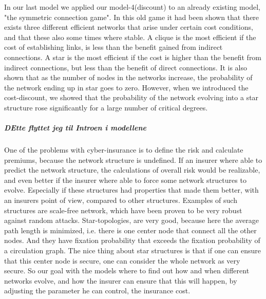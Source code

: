 In our last model we applied our model-4(discount) to an already existing model, "the symmetric connection game". In this old game it had been shown that there exists three different efficient networks that arise under certain cost conditions, and that these also some times where stable. A clique is the most efficient if the cost of establishing links, is less than the benefit gained from indirect connections. A star is the most efficient if the cost is higher than the benefit from indirect connections, but less than the benefit of direct connections. 
It is also shown that as the number of nodes in the networks increase, the probability of the network ending up in star goes to zero. However, when we introduced the cost-discount, we showed that the probability of the network evolving into a star structure rose significantly for a large number of critical degrees. 
\subparagraph{DEtte flyttet jeg til Introen i modellene}
One of the problems with cyber-insurance is to define the risk and calculate premiums, because the network structure is undefined. If an insurer where able to predict the network structure, the calculations of overall risk would be realizable, and even better if the insurer where able to force some network structures to evolve. Especially if these structures had properties that made them better, with an insurers point of view, compared to other structures. Examples of such structures are scale-free network, which have been proven to be very robust against random attacks. Star-topologies, are very good, because here the average path length is minimized, i.e. there is one center node that connect all the other nodes. And they have fixation probability that exceeds the fixation probability of a circulation graph. The nice thing about star structures is that if one can ensure that this center node is secure, one can consider the whole network as very secure. 
So our goal with the models where to find out how and when different networks evolve, and how the insurer can ensure that this will happen, by adjusting the parameter he can control, the insurance cost. 
